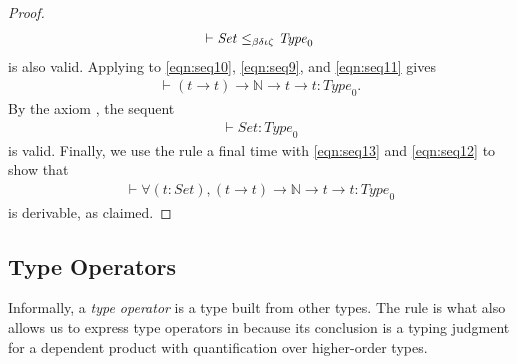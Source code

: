 \begin{proof}
\begin{align}
[t : \mathit{Set}] \vdash \mathit{Set} \subtype{} \mathit{Type}_0 \label{eqn:seq11}
\end{align}
is also valid.
Applying  to \eqref{eqn:seq10}, \eqref{eqn:seq9}, and \eqref{eqn:seq11} gives
\begin{align}
[t : \mathit{Set}] \vdash (t \rightarrow t) \rightarrow \mathbb{N} \rightarrow t \rightarrow t : \mathit{Type}_0. \label{eqn:seq12}
\end{align}
By the axiom , the sequent
\begin{align}
\vdash \mathit{Set} : \mathit{Type}_0 \label{eqn:seq13}
\end{align}
is valid.
Finally, we use the rule  a final time with \eqref{eqn:seq13} and \eqref{eqn:seq12} to show that
\begin{align}
\vdash \forall (t : \mathit{Set}), (t \rightarrow t) \rightarrow \mathbb{N} \rightarrow t \rightarrow t : \mathit{Type}_0
\end{align}
is derivable, as claimed.

\end{proof}

\subsection{Type Operators}
\label{subsec:tpop}

Informally, a \emph{type operator} is a type built from other types. The  rule is what also allows us to express type operators in \coc{} because its conclusion is a typing judgment for a dependent product with quantification over higher-order types.

